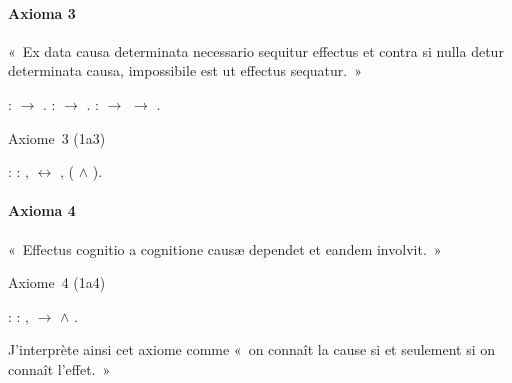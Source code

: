 \documentclass[12pt]{report}
\begin{document}
\paragraph{Axioma 3}

 « Ex data causa determinata necessario sequitur effectus et contra
  si nulla detur determinata causa, impossibile est ut effectus
  sequatur. » \begin{coqdoccode}
\coqdocemptyline
\coqdocindent{1.00em}
 :  \ensuremath{\rightarrow} .\coqdoceol
\coqdocindent{1.00em}
 :  \ensuremath{\rightarrow} .\coqdoceol
\coqdocindent{1.00em}
 :  \ensuremath{\rightarrow}  \ensuremath{\rightarrow} .\coqdoceol
\coqdocemptyline
\end{coqdoccode}
Axiome 3 (1a3) \begin{coqdoccode}
\coqdocindent{1.00em}
 :\coqdoceol
\coqdocindent{2.00em}
\coqdockw{\ensuremath{\forall}} : , \coqdoceol
\coqdocindent{3.00em}
  \coqdoceol
\coqdocindent{3.00em}
\ensuremath{\leftrightarrow} \coqdoceol
\coqdocindent{3.00em}
\coqdoctac{\ensuremath{\exists}} , (  \ensuremath{\land}   ).\coqdoceol
\coqdocemptyline
\end{coqdoccode}
\paragraph{Axioma 4}

 « Effectus cognitio a cognitione causæ dependet et eandem
  involvit. » 

 Axiome 4 (1a4) \begin{coqdoccode}
\coqdocindent{1.00em}
 :\coqdoceol
\coqdocindent{2.00em}
\coqdockw{\ensuremath{\forall}}  : ,\coqdoceol
\coqdocindent{3.00em}
   \ensuremath{\rightarrow} \coqdoceol
\coqdocindent{3.00em}
   \ensuremath{\land}   .\coqdoceol
\coqdocemptyline
\end{coqdoccode}
J'interprète ainsi cet axiome comme « on connaît la cause si et
  seulement si on connaît l'effet. » 
\end{document}
